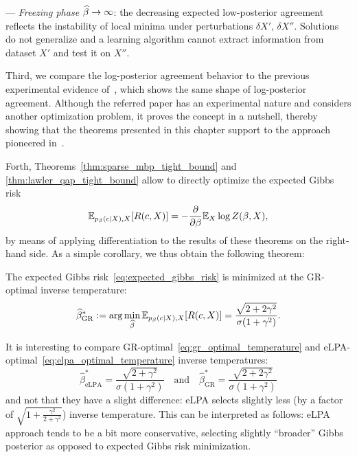 --- \textit{Freezing phase} $\widehat{\beta} \to \infty$: the decreasing expected
    low-posterior agreement reflects the instability of local minima under
    perturbations $\delta X',\,\delta X''$. Solutions do not generalize and a
    learning algorithm cannot extract information from dataset $X'$ and test it
    on $X''$.

Third, we compare the log-posterior agreement behavior to the previous
experimental evidence of~\citet[Fig.~2]{morteza12}, which shows the same
shape of log-posterior agreement. Although the referred paper has an
experimental nature and considers another optimization problem, it proves the
concept in a nutshell, thereby showing that the theorems presented in this chapter
support to the approach
pioneered in~\citep{JB:ISIT:2010,busse2013}.

Forth, Theorems~\ref{thm:sparse_mbp_tight_bound} and
\ref{thm:lawler_qap_tight_bound} allow to directly optimize the expected Gibbs risk
\begin{equation}\label{eq:expected_gibbs_risk}
  \mathbb{E}_{p_\beta(c|X), X}[R(c,X)] = - \frac{\partial}{\partial \beta} \mathbb{E}_X \log Z(\beta, X),
\end{equation}
by means of applying differentiation to the results of these theorems on the right-hand side. As a simple corollary,
we thus obtain the following theorem:

\begin{theorem}\label{thm:gibbs_risk_minimization}
The expected Gibbs risk~\eqref{eq:expected_gibbs_risk} is minimized at the GR-optimal
inverse temperature:
\begin{equation}\label{eq:gr_optimal_temperature}
\widehat{\beta}^*_{\mathrm{GR}} 
          := \arg \min_{\widehat \beta} \mathbb{E}_{p_\beta(c|X), X}[R(c,X)] 
          = \frac{\sqrt{2 +  2\gamma^2}}{\sigma(1+\gamma^2)}.
\end{equation}
%
\end{theorem}
It is interesting to compare GR-optimal~\eqref{eq:gr_optimal_temperature} and
eLPA-optimal~\eqref{eq:elpa_optimal_temperature} inverse temperatures:
\begin{equation}
  \hat{\beta}^*_{\mathrm{eLPA}} 
    = \frac{\sqrt{2+\gamma^2}}{\sigma(1+\gamma^2)}
  \quad \text{and} \quad 
  \hat{\beta}^*_{\mathrm{GR}} 
    = \frac{\sqrt{2 + 2\gamma^2}}{\sigma(1+\gamma^2)}
\end{equation}
and not that they have a slight difference: eLPA selects slightly less (by a
factor of $\sqrt{1 + \frac{\gamma^2}{2 + \gamma^2}}$) inverse temperature. This can be
interpreted as follows: eLPA approach tends to be a bit more conservative, selecting
slightly ``broader'' Gibbs posterior as opposed to expected Gibbs risk minimization.

